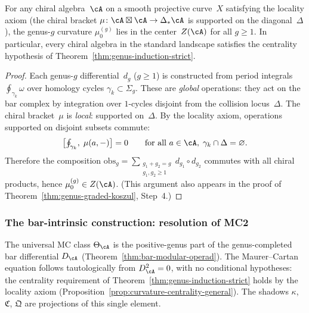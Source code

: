 \begin{proposition}
\label{prop:curvature-centrality-general}%
%
%
For any chiral algebra~$\cA$ on a smooth projective curve~$X$
satisfying the locality axiom \textup{(}the chiral bracket
$\mu\colon \cA \boxtimes \cA \to \Delta_* \cA$ is supported on
the diagonal~$\Delta$\textup{)}, the genus-$g$ curvature
$\mu_0^{(g)}$ lies in the center~$Z(\cA)$ for all $g \geq 1$.
In particular, every chiral algebra in the standard landscape
satisfies the centrality hypothesis of
Theorem~\textup{\ref{thm:genus-induction-strict}}.
\end{proposition}

\begin{proof}
Each genus-$g$ differential~$d_g$ ($g \geq 1$) is constructed from
period integrals $\oint_{\gamma_k} \omega$ over homology cycles
$\gamma_k \subset \Sigma_g$.  These are \emph{global} operations:
they act on the bar complex by integration over $1$-cycles disjoint
from the collision locus~$\Delta$.  The chiral bracket~$\mu$ is
\emph{local}: supported on~$\Delta$.  By the locality axiom,
operations supported on disjoint subsets commute:
\[
  \bigl[\textstyle\oint_{\gamma_k},\;\mu(a,-)\bigr] = 0
  \qquad \text{for all } a \in \cA,\;
  \gamma_k \cap \Delta = \varnothing.
\]
Therefore the composition
$\mathrm{obs}_g
= \sum_{\substack{g_1+g_2=g \\ g_1,g_2 \geq 1}} d_{g_1} \circ d_{g_2}$
commutes with all chiral products, hence
$\mu_0^{(g)} \in Z(\cA)$.
\textup{(}This argument also appears in the proof of
Theorem~\textup{\ref{thm:genus-graded-koszul}}, Step~4.\textup{)}
\end{proof}

\subsubsection*{The bar-intrinsic construction: resolution of MC2}

The universal MC class $\Theta_\cA$ is the
positive-genus part of the genus-completed bar differential
$D_\cA$ (Theorem~\ref{thm:bar-modular-operad}).  The Maurer--Cartan equation
follows tautologically from $D_\cA^2 = 0$, with no conditional
hypotheses: the centrality requirement of
Theorem~\ref{thm:genus-induction-strict} holds by the locality axiom
(Proposition~\ref{prop:curvature-centrality-general}).
The shadows $\kappa$, $\mathfrak{C}$, $\mathfrak{Q}$ are
projections of this single element.

